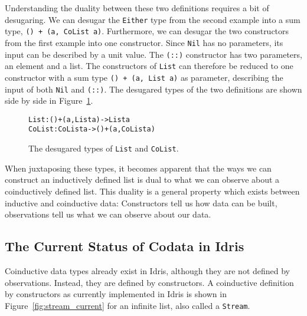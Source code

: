 Understanding the duality between these two definitions requires a bit of desugaring. We can desugar the \texttt{Either} type from the second example into a sum type, \texttt{() + (a, CoList a)}. Furthermore, we can desugar the two constructors from the first example into one constructor. Since \texttt{Nil} has no parameters, its input can be described by a unit value. The \texttt{(::)} constructor has two parameters, an element and a list. The constructors of \texttt{List} can therefore be reduced to one constructor with a sum type \texttt{() + (a, List a)} as parameter, describing the input of both \texttt{Nil} and \texttt{(::)}. The desugared types of the two definitions are shown side by side in Figure~\ref{fig:List_CoList_duality}.

\begin{figure}
\begin{alltt}
List   : () + (a, List a)   ->   List a
CoList : CoList a           ->   () + (a, CoList a)
\end{alltt}
\caption{The desugared types of \texttt{List} and \texttt{CoList}.}
\label{fig:List_CoList_duality}
\end{figure}

When juxtaposing these types, it becomes apparent that the ways we can construct an inductively defined list is dual to what we can observe about a coinductively defined list. This duality is a general property which exists between inductive and coinductive data: Constructors tell us how data can be built, observations tell us what we can observe about our data.


\subsection{The Current Status of Codata in Idris}
\label{sec:stateinidris}
Coinductive data types already exist in Idris, although they are not defined by observations. Instead, they are defined by constructors. A coinductive definition by constructors as currently implemented in Idris is shown in Figure~\ref{fig:stream_current} for an infinite list, also called a \texttt{Stream}.

